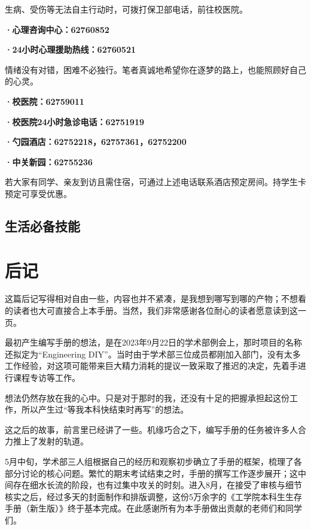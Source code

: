 \documentclass[11pt,oneside]{book}
\begin{document}
生病、受伤等无法自主行动时，可拨打保卫部电话，前往校医院。

\vspace{10pt}

\textbf{·心理咨询中心：62760852}

\textbf{·24小时心理援助热线：62760521}

情绪没有对错，困难不必独行。笔者真诚地希望你在逐梦的路上，也能照顾好自己的心灵。

\vspace{10pt}

\textbf{·校医院：62759011}

\textbf{·校医院24小时急诊电话：62751919}

\textbf{·勺园酒店：62752218，62757361，62752200}

\textbf{·中关新园：62755236}

若大家有同学、亲友到访且需住宿，可通过上述电话联系酒店预定房间。持学生卡预定可享受优惠。

\section{生活必备技能}

\backmatter

\chapter*{后记}
这篇后记写得相对自由一些，内容也并不紧凑，是我想到哪写到哪的产物；不想看的读者也大可直接合上本手册。当然，我们非常感谢各位耐心的读者愿意读到这一页。

最初产生编写手册的想法，是在2023年9月22日的学术部例会上，那时项目的名称还拟定为“Engineering DIY”。当时由于学术部三位成员都刚加入部门，没有太多工作经验，对这项可能带来巨大精力消耗的提议一致采取了推迟的决定，先着手进行课程专访等工作。

想法仍然存放在我的心中。只是对于那时的我，还没有十足的把握承担起这份工作，所以产生过“等我本科快结束时再写”的想法。

这之后的故事，前言里已经讲了一些。机缘巧合之下，编写手册的任务被许多人合力推上了发射的轨道。

5月中旬，学术部三人组根据自己的经历和观察初步确立了手册的框架，梳理了各部分讨论的核心问题。繁忙的期末考试结束之时，手册的撰写工作逐步展开；这中间存在细水长流的阶段，也有过集中攻关的时刻。进入8月，在接受了审核与细节核实之后，经过多天的封面制作和排版调整，这份5万余字的《工学院本科生生存手册（新生版）》终于基本完成。在此感谢所有为本手册做出贡献的老师们和同学们。
\end{document}
